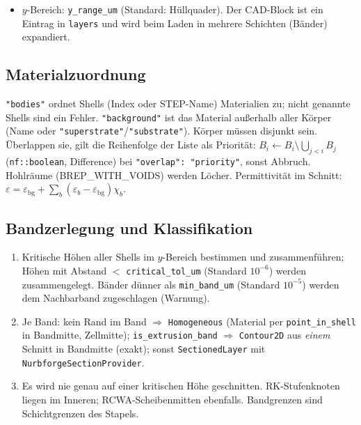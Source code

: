 \begin{itemize}[nosep]
        1D-Gittern (M23, Intervall-Vereinigung). Berührt ein Körper sein eigenes Bild entlang eines Randstücks (z.\,B. eine über genau
        $d_z$ extrudierte Linie), umläuft seine periodische Vereinigung die Zelle als Streifen, der keine geschlossene
        Kontur ist, und die gemeinsame Kante ist keine Materialgrenze: \verb|PERIODIC_OVERLAP| auch mit
        \verb|periodic_union| (v2.21; vorher bestand die Prüfung, und erst der Löser lehnte die Schicht ab).
  \item $y$-Bereich: \verb|y_range_um| (Standard: Hüllquader). Der CAD-Block ist ein Eintrag in \verb|layers| und
        wird beim Laden in mehrere Schichten (Bänder) expandiert.
\end{itemize}

\subsection{Materialzuordnung}
\verb|"bodies"| ordnet Shells (Index oder STEP-Name) Materialien zu; nicht genannte Shells sind ein Fehler.
\verb|"background"| ist das Material außerhalb aller Körper (Name oder \verb|"superstrate"|/\verb|"substrate"|).
Körper müssen disjunkt sein. Überlappen sie, gilt die Reihenfolge der Liste als Priorität:
$B_i\leftarrow B_i\setminus\bigcup_{j<i}B_j$ (\verb|nf::boolean|, Difference) bei \verb|"overlap": "priority"|,
sonst Abbruch. Hohlräume (BREP\_WITH\_VOIDS) werden Löcher. Permittivität im Schnitt:
$\varepsilon=\varepsilon_{\text{bg}}+\sum_b(\varepsilon_b-\varepsilon_{\text{bg}})\chi_b$.

\subsection{Bandzerlegung und Klassifikation}
\begin{enumerate}[nosep]
  \item Kritische Höhen aller Shells im $y$-Bereich bestimmen und zusammenführen; Höhen mit Abstand
        $<$ \verb|critical_tol_um| (Standard $10^{-6}$) werden zusammengelegt. Bänder dünner als
        \verb|min_band_um| (Standard $10^{-5}$) werden dem Nachbarband zugeschlagen (Warnung).
  \item Je Band: kein Rand im Band $\Rightarrow$ \verb|Homogeneous| (Material per \verb|point_in_shell| in Bandmitte,
        Zellmitte); \verb|is_extrusion_band| $\Rightarrow$ \verb|Contour2D| aus \emph{einem} Schnitt in Bandmitte
        (exakt); sonst \verb|SectionedLayer| mit \verb|NurbforgeSectionProvider|.
  \item Es wird nie genau auf einer kritischen Höhe geschnitten. RK-Stufenknoten liegen im Inneren; RCWA-Scheibenmitten
        ebenfalls. Bandgrenzen sind Schichtgrenzen des Stapels.
\end{enumerate}

